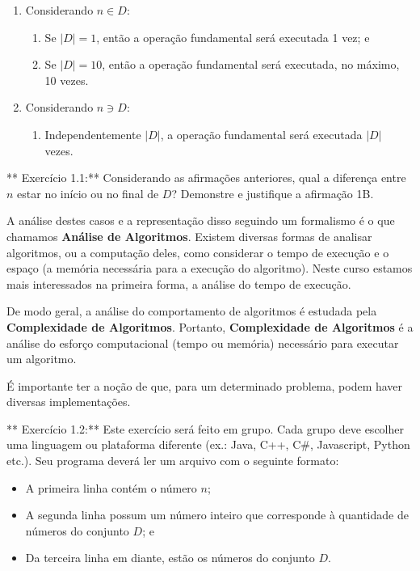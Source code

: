 \documentclass{article}
\begin{document}
\begin{enumerate}
\def\labelenumi{\arabic{enumi}.}
\itemsep1pt\parskip0pt
\item
  Considerando \(n \in D\):

  \begin{enumerate}
  \def\labelenumii{\arabic{enumii}.}
  \itemsep1pt\parskip0pt
  \item
    Se \(|D| = 1\), então a operação fundamental será executada 1 vez; e
  \item
    Se \(|D| = 10\), então a operação fundamental será executada, no
    máximo, 10 vezes.
  \end{enumerate}
\item
  Considerando \(n \ni D\):

  \begin{enumerate}
  \def\labelenumii{\arabic{enumii}.}
  \itemsep1pt\parskip0pt
  \item
    Independentemente \(|D|\), a operação fundamental será executada
    \(|D|\) vezes.
  \end{enumerate}
\end{enumerate}

** Exercício 1.1:** Considerando as afirmações anteriores, qual a
diferença entre \(n\) estar no início ou no final de \(D\)? Demonstre e
justifique a afirmação 1B.

A análise destes casos e a representação disso seguindo um formalismo é
o que chamamos \textbf{Análise de Algoritmos}. Existem diversas formas
de analisar algoritmos, ou a computação deles, como considerar o tempo
de execução e o espaço (a memória necessária para a execução do
algoritmo). Neste curso estamos mais interessados na primeira forma, a
análise do tempo de execução.

De modo geral, a análise do comportamento de algoritmos é estudada pela
\textbf{Complexidade de Algoritmos}. Portanto, \textbf{Complexidade de
Algoritmos} é a análise do esforço computacional (tempo ou memória)
necessário para executar um algoritmo.

É importante ter a noção de que, para um determinado problema, podem
haver diversas implementações.

** Exercício 1.2:** Este exercício será feito em grupo. Cada grupo deve
escolher uma linguagem ou plataforma diferente (ex.: Java, C++, C\#,
Javascript, Python etc.). Seu programa deverá ler um arquivo com o
seguinte formato:

\begin{itemize}
\itemsep1pt\parskip0pt
\item
  A primeira linha contém o número \(n\);
\item
  A segunda linha possum um número inteiro que corresponde à quantidade
  de números do conjunto \(D\); e
\item
  Da terceira linha em diante, estão os números do conjunto \(D\).
\end{itemize}
\end{document}

